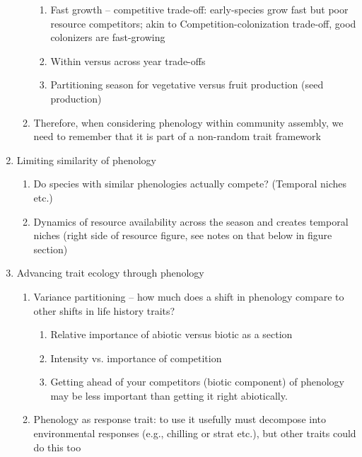 \documentclass[11pt]{article}
\begin{document}
\begin{enumerate}
\begin{enumerate}
\begin{enumerate}
\item Fast growth – competitive trade-off: early-species grow fast but poor resource competitors; akin to Competition-colonization trade-off, good colonizers are fast-growing %
\item Within versus across year trade-offs \citep{silvertown1981,Wilczek:2009oa}
\item Partitioning season for vegetative versus fruit production (seed production)
\end{enumerate}
\item Therefore, when considering phenology within community assembly, we need to remember that it is part of a non-random trait framework
\end{enumerate}
\item Limiting similarity of phenology %
\begin{enumerate}
\item Do species with similar phenologies actually compete? (Temporal niches etc.)
\item Dynamics of resource availability across the season and creates temporal niches (right side of resource figure, see notes on that below in figure section) %
\end{enumerate}
\item Advancing trait ecology through phenology %
\begin{enumerate}
\item Variance partitioning -- how much does a shift in phenology compare to other shifts in life history traits?
\begin{enumerate}
\item Relative importance of abiotic versus biotic as a section
\item Intensity vs. importance of competition %
\item Getting ahead of your competitors (biotic component) of phenology may be less important than getting it right abiotically.
\end{enumerate}
\item Phenology as response trait:  to use it usefully must decompose into environmental responses (e.g., chilling or strat etc.), but other traits could do this too %

\end{enumerate}
\end{enumerate}
\end{document}
